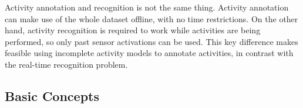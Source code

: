 Activity annotation and recognition is not the same thing. Activity annotation can make use of the whole dataset offline, with no time restrictions. On the other hand, activity recognition is required to work while activities are being performed, so only past sensor activations can be used. This key difference makes feasible using incomplete activity models to annotate activities, in contrast with the real-time recognition problem.

\subsection{Basic Concepts}

